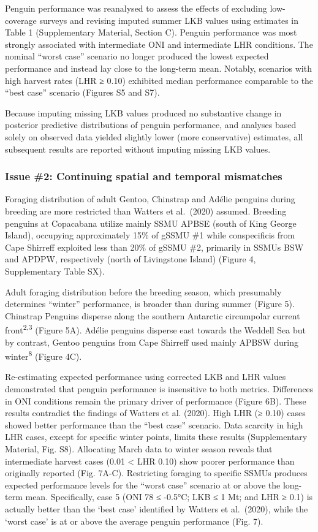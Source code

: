 \documentclass[]{elsarticle} %
\begin{document}
Penguin performance was reanalysed to assess the effects of excluding
low-coverage surveys and revising imputed summer LKB values using
estimates in Table 1 (Supplementary Material, Section C). Penguin
performance was most strongly associated with intermediate ONI and
intermediate LHR conditions. The nominal ``worst case'' scenario no
longer produced the lowest expected performance and instead lay close to
the long-term mean. Notably, scenarios with high harvest rates (LHR ≥
0.10) exhibited median performance comparable to the ``best case''
scenario (Figures S5 and S7).

Because imputing missing LKB values produced no substantive change in
posterior predictive distributions of penguin performance, and analyses
based solely on observed data yielded slightly lower (more conservative)
estimates, all subsequent results are reported without imputing missing
LKB values.

\subsubsection{Issue \#2: Continuing spatial and temporal
mismatches}\label{issue-2-continuing-spatial-and-temporal-mismatches-1}

Foraging distribution of adult Gentoo, Chinstrap and Adélie penguins
during breeding are more restricted than Watters et al.~(2020) assumed.
Breeding penguins at Copacabana utilize mainly SSMU APBSE (south of King
George Island), occupying approximately 15\% of gSSMU \#1 while
conspecificis from Cape Shirreff exploited less than 20\% of gSSMU \#2,
primarily in SSMUs BSW and APDPW, respectively (north of Livingstone
Island) (Figure 4, Supplementary Table SX).

Adult foraging distribution before the breeding season, which presumably
determines ``winter'' performance, is broader than during summer (Figure
5). Chinstrap Penguins disperse along the southern Antarctic circumpolar
current front\textsuperscript{2,3} (Figure 5A). Adélie penguins disperse
east towards the Weddell Sea but by contrast, Gentoo penguins from Cape
Shirreff used mainly APBSW during winter\textsuperscript{8} (Figure 4C).

Re-estimating expected performance using corrected LKB and LHR values
demonstrated that penguin performance is insensitive to both metrics.
Differences in ONI conditions remain the primary driver of performance
(Figure 6B). These results contradict the findings of Watters et al.
(2020). High LHR (≥ 0.10) cases showed better performance than the
``best case'' scenario. Data scarcity in high LHR cases, except for
specific winter points, limits these results (Supplementary Material,
Fig. S8). Allocating March data to winter season reveals that
intermediate harvest cases (0.01 \textless{} LHR 0.10) show poorer
performance than originally reported (Fig. 7A-C). Restricting foraging
to specific SSMUs produces expected performance levels for the ``worst
case'' scenario at or above the long-term mean. Specifically, case 5
(ONI 78 ≤ -0.5°C; LKB ≤ 1 Mt; and LHR ≥ 0.1) is actually better than the
`best case' identified by Watters et al.~(2020), while the `worst case'
is at or above the average penguin performance (Fig. 7).
\end{document}
